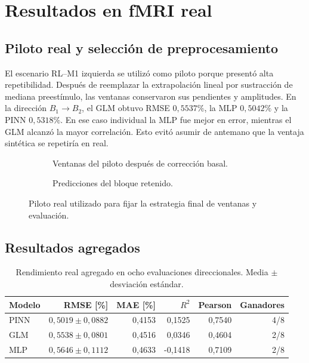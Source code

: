 \chapter{Resultados en fMRI real}

\section{Piloto real y selección de preprocesamiento}
El escenario RL--M1 izquierda se utilizó como piloto porque presentó alta repetibilidad. Después de reemplazar la extrapolación lineal por sustracción de mediana preestímulo, las ventanas conservaron sus pendientes y amplitudes. En la dirección $B_1\rightarrow B_2$, el GLM obtuvo RMSE $0{,}5537\%$, la MLP $0{,}5042\%$ y la PINN $0{,}5318\%$. En ese caso individual la MLP fue mejor en error, mientras el GLM alcanzó la mayor correlación. Esto evitó asumir de antemano que la ventaja sintética se repetiría en real.

\begin{figure}[H]
\centering
\begin{subfigure}[t]{0.49\textwidth}
\caption{Ventanas del piloto después de corrección basal.}
\end{subfigure}\hfill
\begin{subfigure}[t]{0.49\textwidth}
\caption{Predicciones del bloque retenido.}
\end{subfigure}
\caption{Piloto real utilizado para fijar la estrategia final de ventanas y evaluación.}
\label{fig:real_pilot}
\end{figure}

\section{Resultados agregados}
\begin{table}[H]
\centering
\caption{Rendimiento real agregado en ocho evaluaciones direccionales. Media $\pm$ desviación estándar.}
\label{tab:real_summary}
\begin{tabular}{lrrrrr}
\toprule
\textbf{Modelo} & \textbf{RMSE [\%]} & \textbf{MAE [\%]} & \textbf{$R^2$} & \textbf{Pearson} & \textbf{Ganadores} \\
\midrule
PINN & $0,5019\pm0,0882$ & 0,4153 & 0,1525 & 0,7540 & 4/8 \\
GLM  & $0,5538\pm0,0801$ & 0,4516 & 0,0346 & 0,4604 & 2/8 \\
MLP  & $0,5646\pm0,1112$ & 0,4633 & -0,1418 & 0,7109 & 2/8 \\
\bottomrule
\end{tabular}
\end{table}

